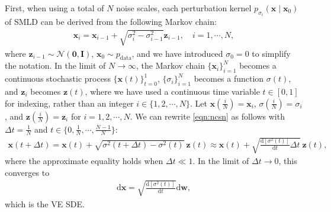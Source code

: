 \documentclass{article} \usepackage{iclr2021_conference,times}
\newcommand{\ud}{\mathrm{d}}
\newcommand{\mcal}{\mathcal}
\newcommand{\bfx}{\mathbf{x}}
\newcommand{\bfw}{\mathbf{w}}
\newcommand{\bfz}{\mathbf{z}}
\newcommand{\bfI}{\mathbf{I}}
\newcommand{\bfzero}{\mathbf{0}}
\begin{document}
First, when using a total of $N$ noise scales, each perturbation kernel $p_{\sigma_i}(\bfx \mid \bfx_0)$ of SMLD can be derived from the following Markov chain:
\begin{align}
\bfx_i = \bfx_{i-1} + \sqrt{\sigma_{i}^2 - \sigma_{i-1}^2} \bfz_{i-1}, \quad i=1,\cdots,N \label{eqn:ncsn},
\end{align}
where $\bfz_{i-1} \sim \mcal{N}(\bfzero, \bfI)$, $\bfx_0 \sim p_\text{data}$, and we have introduced $\sigma_0 = 0$ to simplify the notation.
In the limit of $N \to \infty$, the Markov chain $\{\bfx_i\}_{i=1}^N$ becomes a continuous stochastic process $\{\bfx(t)\}_{t=0}^1$, $\{\sigma_i\}_{i=1}^N$ becomes a function $\sigma(t)$, and $\bfz_i$ becomes $\bfz(t)$, where we have used a continuous time variable $t \in [0, 1]$ for indexing, rather than an integer $i \in \{1, 2, \cdots, N\}$. 
Let $\bfx\left(\frac{i}{N}\right) = \bfx_i$, $\sigma\left(\frac{i}{N}\right) = \sigma_i$, and $\bfz\left(\frac{i}{N}\right) = \bfz_i$ for $i=1,2,\cdots, N$. We can rewrite \cref{eqn:ncsn} as follows with $\Delta t = \frac{1}{N}$ and $t \in \big\{0, \frac{1}{N}, \cdots, \frac{N-1}{N}\big\}$:
\begin{align*}
    \bfx(t + \Delta t) = \bfx(t) + \sqrt{\sigma^2(t + \Delta t)- \sigma^2(t)}~\bfz(t) \approx \bfx(t) + \sqrt{\frac{\ud \left[ \sigma^2(t) \right] }{\ud t}\Delta t} ~\bfz(t),
\end{align*}
where the approximate equality holds when $\Delta t \ll 1$. 
In the limit of $\Delta t \rightarrow 0$, this converges to
\begin{align}
\ud \bfx = \sqrt{\frac{\ud \left[ \sigma^2(t) \right]}{\ud t}}\ud \bfw, \label{eqn:ncsn_sde_2}
\end{align}
which is the VE SDE. 
\end{document}
